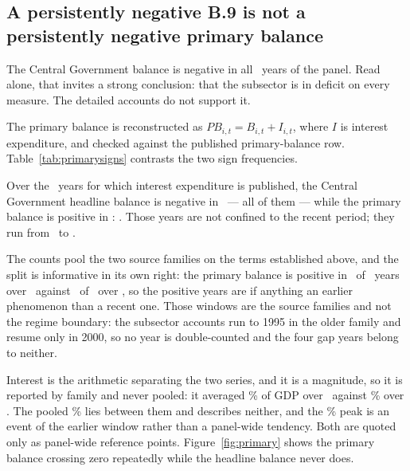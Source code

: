 \subsection{A persistently negative B.9 is not a persistently negative primary balance}

The Central Government balance is negative in all \CentralNegativeYears\ years of
the panel. Read alone, that invites a strong conclusion: that the subsector is in
deficit on every measure. The detailed accounts do not support it.

The primary balance is reconstructed as $PB_{i,t} = B_{i,t} + I_{i,t}$, where $I$ is
interest expenditure, and checked against the published primary-balance row.
Table~\ref{tab:primarysigns} contrasts the two sign frequencies.



Over the \PrimaryObservedYears\ years for which interest expenditure is published,
the Central Government headline balance is negative in
\PrimaryHeadlineNegative\ --- all of them --- while the primary balance is positive
in \PrimaryPositiveYears: \PrimaryPositiveList. Those years are not confined to the
recent period; they run from \PrimaryPositiveFirst\ to \PrimaryPositiveLast.

The counts pool the two source families on the terms established above, and the split is
informative in its own right: the primary balance is positive in
\HistoricalPrimaryPositive\ of \HistoricalPrimaryYears\ years over
\HistoricalPrimaryWindow\ against \ModernPrimaryPositive\ of \ModernPrimaryYears\ over
\ModernPrimaryWindow, so the positive years are if anything an earlier phenomenon than a
recent one. Those windows are the source families and not the regime boundary: the
subsector accounts run to 1995 in the older family and resume only in 2000, so no year is
double-counted and the four gap years belong to neither.

Interest is the arithmetic separating the two series, and it is a magnitude, so it is
reported by family and never pooled: it averaged \HistoricalInterestMean\% of GDP over
\HistoricalPrimaryWindow\ against \ModernInterestMean\% over \ModernPrimaryWindow. The
pooled \InterestMeanPct\% lies between them and describes neither, and the
\InterestPeakPct\% peak is an event of the earlier window rather than a panel-wide
tendency. Both are quoted only as panel-wide reference points.
Figure~\ref{fig:primary} shows the primary balance crossing zero repeatedly while the
headline balance never does.

